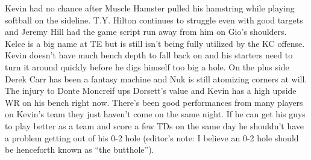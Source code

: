 \documentclass[11pt,letterpaper]{article}
\begin{document}
\par\noindent Kevin had no chance after Muscle Hamster pulled his hamstring while playing softball on the sideline. T.Y. Hilton continues to struggle even with good targets and Jeremy Hill had the game script run away from him on Gio's shoulders. Kelce is a big name at TE but is still isn't being fully utilized by the KC offense. Kevin doesn't have much bench depth to fall back on and his starters need to turn it around quickly before he digs himself too big a hole. On the plus side Derek Carr has been a fantasy machine and Nuk is still atomizing corners at will. The injury to Donte Moncreif ups Dorsett's value and Kevin has a high upside WR on his bench right now. There's been good performances from many players on Kevin's team they just haven't come on the same night. If he can get his guys to play better as a team and score a few TDs on the same day he shouldn't have a problem getting out of his 0-2 hole (editor's note: I believe an 0-2 hole should be henceforth known as ``the butthole'').
\end{document}

